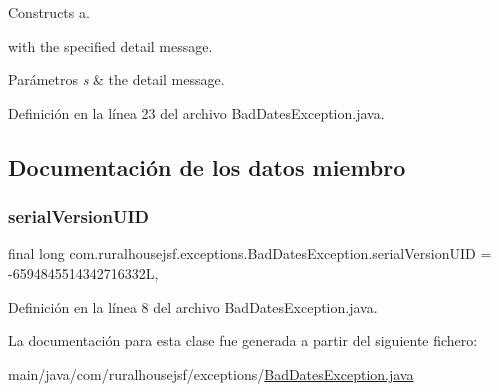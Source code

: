 Constructs a. 


\begin{DoxyCode}{0}
\end{DoxyCode}
 with the specified detail message.


\begin{DoxyParams}{Parámetros}
{\em s} & the detail message. \\
\hline
\end{DoxyParams}


Definición en la línea 23 del archivo Bad\+Dates\+Exception.\+java.



\subsection{Documentación de los datos miembro}
\mbox{\label{a00208_a455e5569f117b53852ac14206bb2177f}} 
\subsubsection{\texorpdfstring{serialVersionUID}{serialVersionUID}}
{\footnotesize\ttfamily final long com.\+ruralhousejsf.\+exceptions.\+Bad\+Dates\+Exception.\+serial\+Version\+U\+ID = -\/6594845514342716332L\hspace{0.3cm}{\ttfamily [static]}, {\ttfamily [private]}}



Definición en la línea 8 del archivo Bad\+Dates\+Exception.\+java.



La documentación para esta clase fue generada a partir del siguiente fichero\+:\begin{DoxyCompactItemize}
\item 
main/java/com/ruralhousejsf/exceptions/\mbox{\hyperlink{a00062}{Bad\+Dates\+Exception.\+java}}\end{DoxyCompactItemize}
